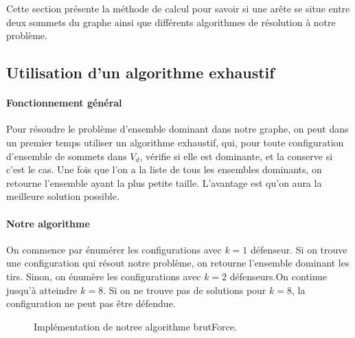 \documentclass[12pt]{article}
\begin{document}
Cette section présente la méthode de calcul pour savoir si une arête se situe entre deux sommets du graphe ainsi que différents algorithmes de résolution à notre problème.


\subsection{Utilisation d'un algorithme exhaustif}

\paragraph{Fonctionnement général}
Pour résoudre le problème d'ensemble dominant dans notre graphe, on peut dans un premier temps utiliser un algorithme exhaustif, qui, pour toute configuration d'ensemble de sommets dans $V_d$, vérifie si elle est dominante, et la conserve si c'est le cas. Une fois que l'on a la liste de tous les ensembles dominants, on retourne l'ensemble ayant la plus petite taille. L'avantage est qu'on aura la meilleure solution possible.

\paragraph{Notre algorithme}
On commence par énumérer les configurations avec $k=1$ défenseur. Si on trouve une configuration qui résout notre problème, on retourne l'ensemble dominant les tirs. Sinon, on énumère  les configurations avec $k=2$ défenseurs.On continue jusqu'à atteindre $k=8$. Si on ne trouve pas de solutions pour $k = 8$, la configuration ne peut pas être défendue.

\begin{figure}[h!]
  \begin{algorithm}[H]
    \BlankLine
  \end{algorithm}
  \caption{Implémentation de notree algorithme brutForce.}
\end{figure}
\end{document}
